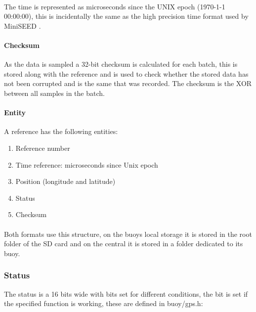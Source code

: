 \documentclass[a4paper]{article}
\begin{document}
\begin{multicols}{2}
    \paragraph{} The time is represented as microseconds since the UNIX
    epoch (1970-1-1 00:00:00), this is incidentally the same as the high
    precision time format used by MiniSEED \cite{libmseed_man}.

    \paragraph{Checksum}
    As the data is sampled a 32-bit checksum is calculated for each
    batch, this is stored along with the reference and is used to check
    whether the stored data has not been corrupted and is the same that
    was recorded. The checksum is the XOR between all samples in the
    batch.

    \paragraph{Entity}
    A reference has the following entities:
    \begin{enumerate}
      \item Reference number
      \item Time reference: microseconds since Unix epoch
      \item Position (longitude and latitude)
      \item Status
      \item Checksum
    \end{enumerate}

    \paragraph{}
    Both formats use this structure, on the buoys local storage it is
    stored in the root folder of the SD card and on the central it is
    stored in a folder dedicated to its buoy.

    \subsubsection{Status} The status is a 16 bits wide with bits set for
    different conditions, the bit is set if the specified function is
    working, these are defined in buoy/gps.h: \\

    \vspace{1em}


\end{multicols}
\end{document}
